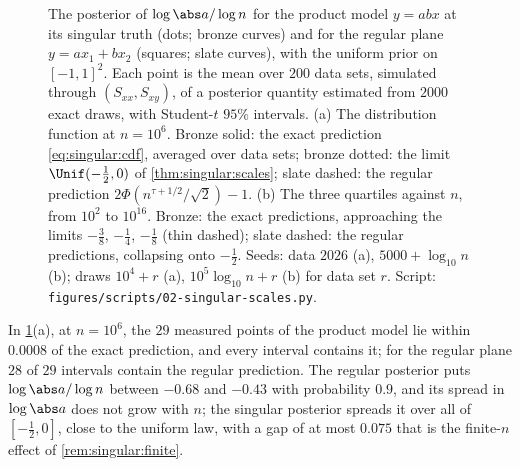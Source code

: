 \begin{refsection}
\begin{figure}[t]
\begin{fullwidth}
\end{fullwidth}
\caption{The posterior of $\log\abs a/\log n$ for the product model $y=abx$ at its singular truth (dots; bronze curves) and for the regular plane $y=ax_1+bx_2$ (squares; slate curves), with the uniform prior on $[-1,1]^2$. Each point is the mean over $200$ data sets, simulated through $(S_{xx},S_{xy})$, of a posterior quantity estimated from $2000$ exact draws, with Student-$t$ $95\%$ intervals. (a) The distribution function at $n=10^6$. Bronze solid: the exact prediction \eqref{eq:singular:cdf}, averaged over data sets; bronze dotted: the limit $\Unif(-\frac12,0)$ of \cref{thm:singular:scales}; slate dashed: the regular prediction $2\Phi(n^{\tau+1/2}/\sqrt2)-1$. (b) The three quartiles against $n$, from $10^2$ to $10^{16}$. Bronze: the exact predictions, approaching the limits $-\frac38$, $-\frac14$, $-\frac18$ (thin dashed); slate dashed: the regular predictions, collapsing onto $-\frac12$. Seeds: data $2026$ (a), $5000+\log_{10}n$ (b); draws $10^4+r$ (a), $10^5\log_{10}n+r$ (b) for data set $r$. Script: \texttt{figures/scripts/02-singular-scales.py}.}\label{fig:singular:scales}
\end{figure}

In \cref{fig:singular:scales}(a), at $n=10^6$, the $29$ measured points of the product model lie within $0.0008$ of the exact prediction, and every interval contains it; for the regular plane $28$ of $29$ intervals contain the regular prediction. The regular posterior puts $\log\abs a/\log n$ between $-0.68$ and $-0.43$ with probability $0.9$, and its spread in $\log\abs a$ does not grow with $n$; the singular posterior spreads it over all of $[-\frac12,0]$, close to the uniform law, with a gap of at most $0.075$ that is the finite-$n$ effect of \cref{rem:singular:finite}.


\end{refsection}
